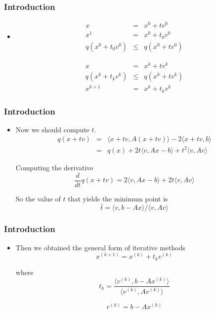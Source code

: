 \documentclass[notheorems,mathserif,table,compress]{beamer}  %
\begin{document}
%
\begin{frame}
\frametitle{Introduction}
\begin{itemize}
\item 
\begin{eqnarray*}
x&=&x^0+tv^0\\
x^1&=&x^0+t_0v^0\\
q(x^0+t_0v^0)&\leq& q(x^0+tv^0)
\end{eqnarray*}

\begin{eqnarray*}
x&=&x^k+tv^k\\
q(x^k+t_kv^k)&\leq& q(x^k+tv^k)\\
x^{k+1}&=&x^{k}+t_kv^k
\end{eqnarray*}

\end{itemize}
\end{frame}

%
\begin{frame}
\frametitle{Introduction}
\begin{itemize}
\item Now we should compute $t$.
\begin{eqnarray*}
q(x+tv)&=&\langle x+tv,A(x+tv) \rangle-2\langle x+tv,b \rangle\\
       &=&q(x)+2t\langle v,Ax-b \rangle+t^2\langle v,Av \rangle    
\end{eqnarray*}

Computing the derivative 
\begin{displaymath}
\frac{d}{dt}q(x+tv)=2\langle v,Ax-b \rangle+2t\langle v,Av\rangle
\end{displaymath}

So the value of $t$ that yields the minimum point is
\begin{displaymath}
\hat{t}=\langle v,b-Ax \rangle/\langle v,Av \rangle
\end{displaymath}

\end{itemize}
\end{frame}

%
\begin{frame}
\frametitle{Introduction}
\begin{itemize}
\item Then we obtained the general form of iterative methods
\begin{displaymath}
x^{(k+1)}=x^{(k)}+t_kv^{(k)}
\end{displaymath}

where
\begin{displaymath}
t_k=\frac{\langle v^{(k)},b-Ax^{(k)} \rangle}{\langle v^{(k)},Av^{(k)} \rangle}
\end{displaymath}

\begin{displaymath}
r^{(k)}=b-Ax^{(k)}
\end{displaymath}
\end{itemize}
\end{frame}
\end{document}
